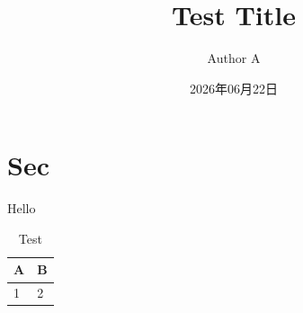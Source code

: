 \documentclass[twocolumn,dark,nomath]{harryopo-paper}
\title{Test Title}
\author{Author A}
\date{2026年06月22日}
\begin{document}
\twocolumn[%
  \maketitle
  \vspace{0.5cm}
]%
\section{Sec}
Hello
\begin{table}[htbp]
  \centering
  \caption{Test}
  \begin{tabular}{ll}
    \toprule A & B \\ \midrule 1 & 2 \\ \bottomrule
  \end{tabular}
\end{table}
\end{document}
